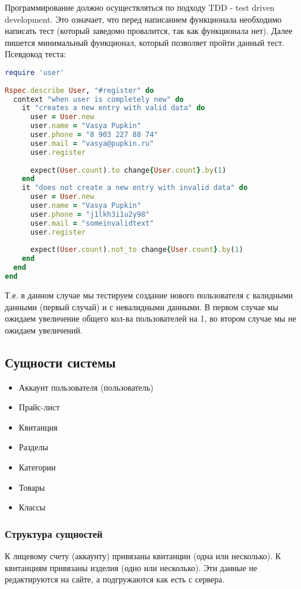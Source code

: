 \documentclass[DIV=calc, paper=a4, fontsize=11pt]{scrartcl} %
\begin{document}
Программирование должно осуществляться по подходу TDD - test driven development. Это означает, что перед написанием функционала необходимо написать тест (который заведомо провалится, так как функционала нет). Далее пишется минимальный функционал, который позволяет пройти данный тест.
\\[0.5cm]
Псевдокод теста:
\begin{lstlisting}[language=Ruby]
require 'user'
	
Rspec.describe User, "#register" do
  context "when user is completely new" do
	it "creates a new entry with valid data" do
	  user = User.new
      user.name = "Vasya Pupkin"
	  user.phone = "8 903 227 88 74"
	  user.mail = "vasya@pupkin.ru"
	  user.register
				
	  expect(User.count).to change{User.count}.by(1)
	end
    it "does not create a new entry with invalid data" do
      user = User.new
	  user.name = "Vasya Pupkin"
	  user.phone = "j1lkh3i1u2y98"
	  user.mail = "someinvalidtext"
	  user.register	
		
      expect(User.count).not_to change{User.count}.by(1)
	end
  end
end
\end{lstlisting}
Т.е. в данном случае мы тестируем создание нового пользователя с валидными данными (первый случай) и с невалидными данными. В первом случае мы ожидаем увеличение общего кол-ва пользователей на 1, во втором случае мы не ожидаем увеличений.

\subsection{Сущности системы}

\begin{itemize}
	\item Аккаунт пользователя (пользователь)
	\item Прайс-лист
	\item Квитанция
	\item Разделы
	\item Категории
	\item Товары
	\item Классы
\end{itemize}

\subsubsection{Структура сущностей}

К лицевому счету (аккаунту) привязаны квитанции (одна или несколько). К квитанциям привязаны изделия (одно или несколько). Эти данные не редактируются на сайте, а подгружаются как есть с сервера.
\end{document}
